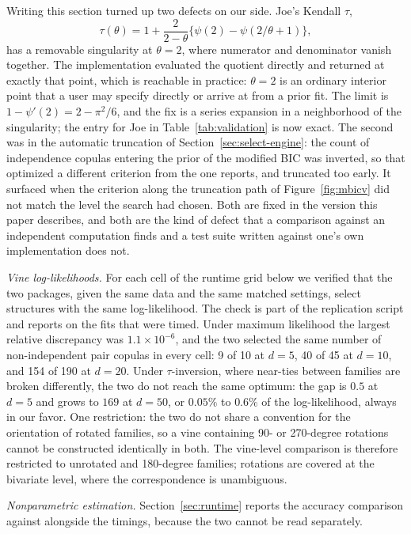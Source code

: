 \documentclass[article]{jss}
\begin{document}
Writing this section turned up two defects on our side.  Joe's Kendall
$\tau$,
\[
  \tau(\theta) = 1 + \frac{2}{2 - \theta}
    \bigl\{ \psi(2) - \psi(2/\theta + 1) \bigr\},
\]
has a removable singularity at $\theta = 2$, where numerator and denominator
vanish together.  The implementation evaluated the quotient directly and
returned  at exactly that point, which is reachable in practice:
$\theta = 2$ is an ordinary interior point that a user may specify directly or
arrive at from a prior fit.  The limit is $1 - \psi'(2) =
2 - \pi^2/6$, and the fix is a series expansion in a neighborhood of the
singularity; the entry for Joe in Table~\ref{tab:validation} is now exact.
The second was in the automatic truncation of
Section~\ref{sec:select-engine}: the count of independence copulas entering
the prior of the modified BIC was inverted, so that 
optimized a different criterion from the one  reports, and
truncated too early.  It surfaced when the criterion along the truncation path
of Figure~\ref{fig:mbicv} did not match the level the search had chosen.  Both
are fixed in the version this paper describes, and both are the kind of defect
that a comparison against an independent computation finds and a test suite
written against one's own implementation does not.

\emph{Vine log-likelihoods.}  For each cell of the runtime grid below we
verified that the two packages, given the same data and the same matched
settings, select structures with the same log-likelihood.  The check is part of
the replication script and reports on the fits that were timed.  Under maximum
likelihood the largest
relative discrepancy was $1.1 \times 10^{-6}$, and the two selected the same
number of non-independent pair copulas in every cell: 9 of 10 at $d = 5$, 40
of 45 at $d = 10$, and 154 of 190 at $d = 20$.  Under $\tau$-inversion, where
near-ties between families are broken differently, the two do not reach the same
optimum: the gap is $0.5$ at $d = 5$ and grows to $169$ at $d = 50$, or $0.05\%$
to $0.6\%$ of the log-likelihood, always in our favor.  One restriction: the
two
do not share a convention for the orientation of rotated families, so a vine
containing 90- or 270-degree rotations cannot be constructed identically in
both.  The vine-level comparison is therefore restricted to unrotated and
180-degree families; rotations are covered at the bivariate level, where the
correspondence is unambiguous.

\emph{Nonparametric estimation.}  Section~\ref{sec:runtime} reports the
accuracy comparison against  alongside the timings, because the
two cannot be read separately.
\end{document}
